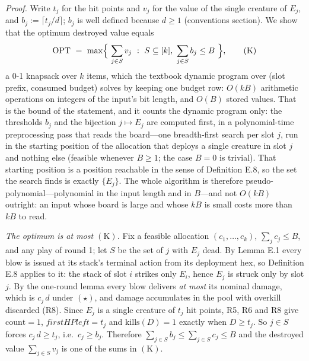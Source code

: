 \documentclass[11pt,a4paper]{article}
\theoremstyle{plain}
\theoremstyle{definition}
\theoremstyle{plain}
\theoremstyle{definition}
\theoremstyle{remark}
\begin{document}
\noindent\emph{Proof.} Write $t_j$ for the hit points and $v_j$ for the value of the single
creature of $E_j$, and $b_j:=\lceil t_j/d\rceil$; $b_j$ is well defined because $d\ge 1$
(conventions section). We show that the optimum destroyed value equals
\begin{equation*}
  \mathrm{OPT}\ =\ \max\Bigl\{\ \sum_{j\in S}v_j\ :\ S\subseteq[k],\ \sum_{j\in S}b_j\le B\ \Bigr\},
  \tag{K}
\end{equation*}
a 0-1 knapsack over $k$ items, which the textbook dynamic program over (slot prefix,
consumed budget) solves by keeping one budget row: $O(kB)$ arithmetic operations on integers
of the input's bit length, and $O(B)$ stored values. That is the bound of the statement, and
it counts the dynamic program only: the thresholds $b_j$ and the bijection $j\mapsto E_j$ are
computed first, in a polynomial-time preprocessing pass that reads the board---one
breadth-first search per slot $j$, run in the starting position of the allocation that
deploys a single creature in slot $j$ and nothing else (feasible whenever $B\ge 1$; the case
$B=0$ is trivial). That starting position is a position reachable in the sense of
Definition E.8, so the set the search finds is exactly $\{E_j\}$. The whole algorithm is
therefore pseudo-polynomial---polynomial in the input length and in $B$---and not $O(kB)$
outright: an input whose board is large and whose $kB$ is small costs more than $kB$ to
read.

\emph{The optimum is at most $(\mathrm{K})$.} Fix a feasible allocation $(c_1,\dots,c_k)$,
$\sum_j c_j\le B$, and any play of round 1; let $S$ be the set of $j$ with $E_j$ dead. By
Lemma E.1 every blow is issued at its stack's terminal action from its deployment hex, so
Definition E.8 applies to it: the stack of slot $i$ strikes only $E_i$, hence $E_j$ is
struck only by slot $j$. By the one-round lemma every blow delivers \emph{at most} its
nominal damage, which is $c_j\,d$ under $(\star)$, and damage accumulates in the pool with
overkill discarded (R8). Since $E_j$ is a single creature of $t_j$ hit points, R5, R6 and R8
give $\mathrm{count}=1$, $\mathit{firstHPleft}=t_j$ and $\mathrm{kills}(D)=1$ exactly when
$D\ge t_j$. So $j\in S$ forces $c_j\,d\ge t_j$, i.e.\ $c_j\ge b_j$. Therefore
$\sum_{j\in S}b_j\le\sum_{j\in S}c_j\le B$ and the destroyed value $\sum_{j\in S}v_j$ is one
of the sums in $(\mathrm{K})$.
\end{document}

